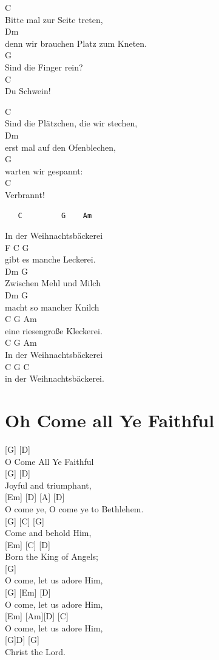 \documentclass[
  letterpaper,
]{scrbook}
\begin{document}
C\\
Bitte mal zur Seite treten,\\
Dm\\
denn wir brauchen Platz zum Kneten.\\
G\\
Sind die Finger rein?\\
C\\
Du Schwein!

C\\
Sind die Plätzchen, die wir stechen,\\
Dm\\
erst mal auf den Ofenblechen,\\
G\\
warten wir gespannt:\\
C\\
Verbrannt!

\begin{verbatim}
   C         G    Am
\end{verbatim}

In der Weihnachtsbäckerei\\
F C G\\
gibt es manche Leckerei.\\
Dm G\\
Zwischen Mehl und Milch\\
Dm G\\
macht so mancher Knilch\\
C G Am\\
eine riesengroße Kleckerei.\\
C G Am\\
In der Weihnachtsbäckerei\\
C G C\\
in der Weihnachtsbäckerei.

\hypertarget{oh-come-all-ye-faithful}{%
\chapter{Oh Come all Ye Faithful}\label{oh-come-all-ye-faithful}}

{[}G{]} {[}D{]}\\
O Come All Ye Faithful\\
{[}G{]} {[}D{]}\\
Joyful and triumphant,\\
{[}Em{]} {[}D{]} {[}A{]} {[}D{]}\\
O come ye, O come ye to Bethlehem.\\
{[}G{]} {[}C{]} {[}G{]}\\
Come and behold Him,\\
{[}Em{]} {[}C{]} {[}D{]}\\
Born the King of Angels;\\
{[}G{]}\\
O come, let us adore Him,\\
{[}G{]} {[}Em{]} {[}D{]}\\
O come, let us adore Him,\\
{[}Em{]} {[}Am{]}{[}D{]} {[}C{]}\\
O come, let us adore Him,\\
{[}G{]}D{]} {[}G{]}\\
Christ the Lord.
\end{document}
